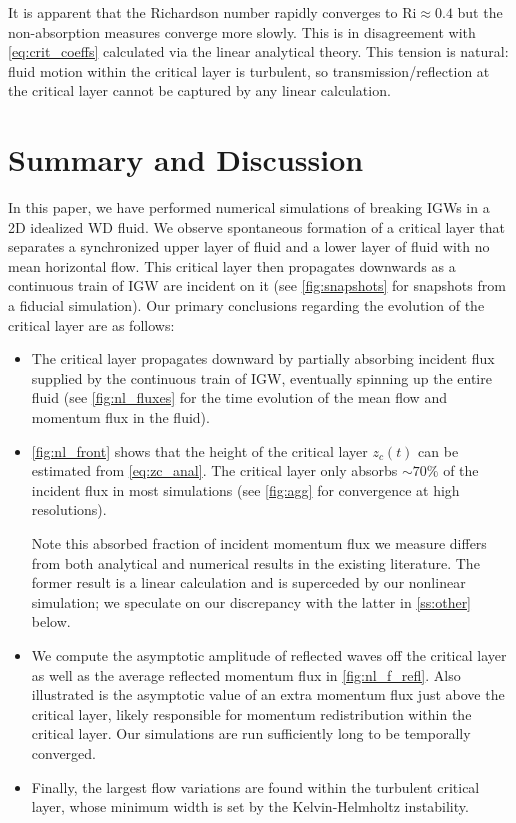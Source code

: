 \documentclass[
        fleqn,
        usenatbib,
        referee,
    ]{mnras}
\begin{document}
It is apparent that the Richardson number rapidly converges to $\mathrm{Ri}
\approx 0.4$ but the non-absorption measures converge more slowly. This is in
disagreement with \autoref{eq:crit_coeffs} calculated via the linear analytical
theory. This tension is natural: fluid motion within the critical layer is
turbulent, so transmission/reflection at the critical layer cannot be captured
by any linear calculation.

\section{Summary and Discussion}\label{s:discussion}

In this paper, we have performed numerical simulations of breaking IGWs in a
2D idealized WD fluid. We observe spontaneous formation of a critical layer that
separates a synchronized upper layer of fluid and a lower layer of fluid with no
mean horizontal flow. This critical layer then propagates downwards as a
continuous train of IGW are incident on it (see \autoref{fig:snapshots} for
snapshots from a fiducial simulation). Our primary conclusions regarding the
evolution of the critical layer are as follows:
\begin{itemize}
    \item The critical layer propagates downward by partially absorbing incident
        flux supplied by the continuous train of IGW, eventually spinning up the
        entire fluid (see \autoref{fig:nl_fluxes} for the time evolution of the
        mean flow and momentum flux in the fluid).

    \item \autoref{fig:nl_front} shows that the height of the critical layer
        $z_c(t)$ can be estimated from \autoref{eq:zc_anal}. The critical layer
        only absorbs $\sim 70\%$ of the incident flux in most simulations (see
        \autoref{fig:agg} for convergence at high resolutions).

        Note this absorbed fraction of incident momentum flux we
        measure differs from both analytical \citep{booker_bretherton} and
        numerical \citep{barker_ogilvie} results in the existing literature. The
        former result is a linear calculation and is superceded by our nonlinear
        simulation; we speculate on our discrepancy with the latter in
        \autoref{ss:other} below.

    \item We compute the asymptotic amplitude of reflected waves off the
        critical layer as well as the average reflected momentum flux in
        \autoref{fig:nl_f_refl}. Also illustrated is the asymptotic value of an
        extra momentum flux just above the critical layer, likely responsible
        for momentum redistribution within the critical layer. Our simulations
        are run sufficiently long to be temporally converged.

    \item Finally, the largest flow variations are found within the turbulent
        critical layer, whose minimum width is set by the Kelvin-Helmholtz
        instability.
\end{itemize}
\end{document}
